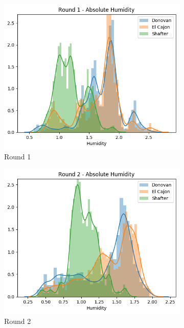 \documentclass[journal abbreviation, manuscript]{copernicus}
\begin{document}
\begin{figure}[H]
\centering
\begin{subfigure}{0.32\textwidth}
\includegraphics[width=\textwidth]{results/distributions/round1_humidity.png}
\caption{Round 1}
\end{subfigure}
\begin{subfigure}{0.32\textwidth}
\includegraphics[width=\textwidth]{results/distributions/round2_humidity.png}
\caption{Round 2}
\end{subfigure}
\begin{subfigure}{0.32\textwidth}

\end{subfigure}
\end{figure}
\end{document}
